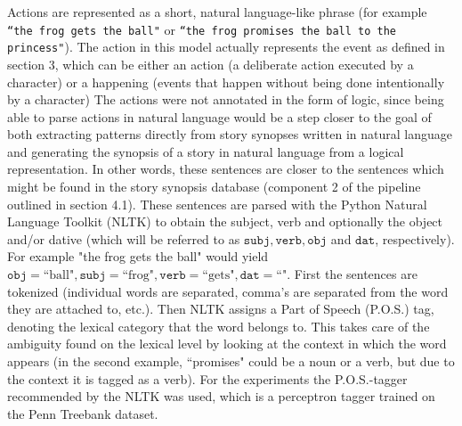 Actions are represented as a short, natural language-like phrase (for example 
\texttt{``the frog gets the ball"}
or \texttt{``the frog promises the ball to the princess"}). The action in this
model actually represents the event as defined in section 3, which
can be either an action (a deliberate action executed by a character) or a happening (events that
happen without being done intentionally by a character)
The actions were not annotated in the form of logic, since being able to parse actions in natural
language would be a step closer to the goal of both extracting patterns directly
from story synopses written in natural language and generating the synopsis of a
story in natural language from a logical representation. In other words, these
sentences are closer to the sentences which might be found in the story synopsis
database (component 2 of the pipeline outlined in section 4.1).
These sentences are parsed with the Python Natural Language Toolkit (NLTK)
\cite{BirdKleinLoper09}
to obtain the subject, verb and optionally the object and/or dative (which will be
referred to as $\texttt{subj}, \texttt{verb}, \texttt{obj}$ and $\texttt{dat}$,
respectively). For example "the frog gets the ball" would yield 
$\texttt{obj}=\textrm{``ball"}, \texttt{subj}=\textrm{``frog"},
\texttt{verb}=\textrm{``gets"}, \texttt{dat}=\textrm{``"} $. First the
sentences are tokenized (individual words are separated, comma's are separated
from the word they are attached to, etc.). Then NLTK assigns a
Part of Speech (P.O.S.) tag, denoting the lexical category that the word belongs
to. This takes care of the ambiguity found on the lexical level by looking at
the context in which the word appears (in the second example, ``promises" could
be a noun or a verb, but due to the context it is tagged as a verb). For the
experiments the P.O.S.-tagger recommended by the NLTK was used, which is a perceptron tagger
trained on the Penn Treebank dataset.

